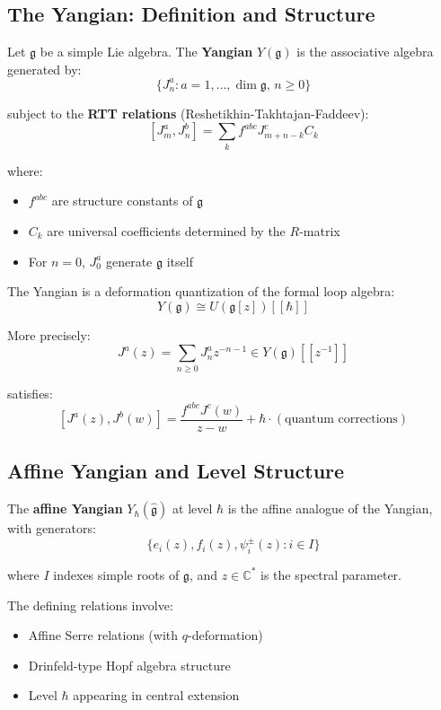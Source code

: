 \subsection{The Yangian: Definition and Structure}

\begin{definition}\label{def:yangian-rtt}
Let $\mathfrak{g}$ be a simple Lie algebra. The \textbf{Yangian} $Y(\mathfrak{g})$ 
is the associative algebra generated by:
$$\{J^a_n : a = 1, \ldots, \dim \mathfrak{g}, \, n \geq 0\}$$

subject to the \textbf{RTT relations} (Reshetikhin-Takhtajan-Faddeev):
$$[J^a_m, J^b_n] = \sum_k f^{abc} J^c_{m+n-k} C_k$$

where:
\begin{itemize}
\item $f^{abc}$ are structure constants of $\mathfrak{g}$
\item $C_k$ are universal coefficients determined by the $R$-matrix
\item For $n = 0$, $J^a_0$ generate $\mathfrak{g}$ itself
\end{itemize}
\end{definition}

\begin{theorem}
The Yangian is a deformation quantization of the formal loop algebra:
$$Y(\mathfrak{g}) \cong U(\mathfrak{g}[z])[[\hbar]]$$

More precisely:
$$J^a(z) = \sum_{n \geq 0} J^a_n z^{-n-1} \in Y(\mathfrak{g})[[z^{-1}]]$$

satisfies:
$$[J^a(z), J^b(w)] = \frac{f^{abc} J^c(w)}{z - w} + \hbar \cdot (\text{quantum corrections})$$
\end{theorem}

\subsection{Affine Yangian and Level Structure}

\begin{definition}
The \textbf{affine Yangian} $Y_{\hbar}(\widehat{\mathfrak{g}})$ at level $\hbar$ 
is the affine analogue of the Yangian, with generators:
$$\{e_i(z), f_i(z), \psi_i^{\pm}(z) : i \in I\}$$

where $I$ indexes simple roots of $\mathfrak{g}$, and $z \in \mathbb{C}^*$ is 
the spectral parameter.

The defining relations involve:
\begin{itemize}
\item Affine Serre relations (with $q$-deformation)
\item Drinfeld-type Hopf algebra structure
\item Level $\hbar$ appearing in central extension
\end{itemize}
\end{definition}

